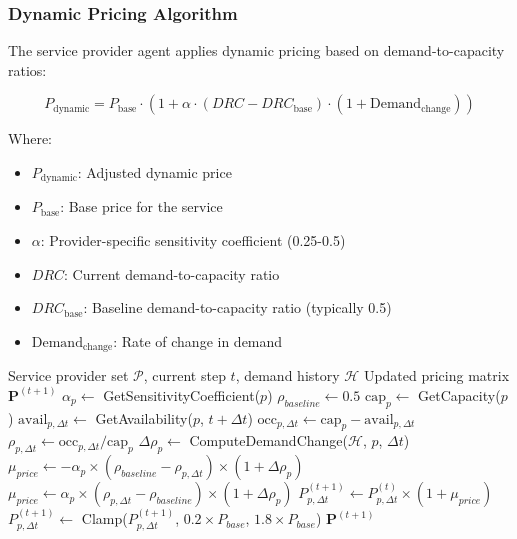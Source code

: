 \subsubsection{Dynamic Pricing Algorithm}
The service provider agent applies dynamic pricing based on demand-to-capacity ratios:

\begin{equation}
P_{\text{dynamic}} = P_{\text{base}} \cdot \left(1 + \alpha \cdot (DRC - DRC_{\text{base}}) \cdot (1 + \text{Demand}_{\text{change}})\right)
\end{equation}

Where:
\begin{itemize}
    \item $P_{\text{dynamic}}$: Adjusted dynamic price
    \item $P_{\text{base}}$: Base price for the service
    \item $\alpha$: Provider-specific sensitivity coefficient (0.25-0.5)
    \item $DRC$: Current demand-to-capacity ratio
    \item $DRC_{\text{base}}$: Baseline demand-to-capacity ratio (typically 0.5)
    \item $\text{Demand}_{\text{change}}$: Rate of change in demand
\end{itemize}

\begin{algorithm}
\caption{Demand-Responsive Dynamic Pricing}
\label{alg:dynamic-pricing}
\begin{algorithmic}[1]
\Require Service provider set $\mathcal{P}$, current step $t$, demand history $\mathcal{H}$
\Ensure Updated pricing matrix $\mathbf{P}^{(t+1)}$
    \State $\alpha_p \gets$ GetSensitivityCoefficient($p$)
    \State $\rho_{baseline} \gets 0.5$ 
     
        \State $\text{cap}_p \gets$ GetCapacity($p$)
        \State $\text{avail}_{p,\Delta t} \gets$ GetAvailability($p$, $t + \Delta t$)
        \State $\text{occ}_{p,\Delta t} \gets \text{cap}_p - \text{avail}_{p,\Delta t}$
        \State $\rho_{p,\Delta t} \gets \text{occ}_{p,\Delta t} / \text{cap}_p$
        \State $\Delta\rho_p \gets$ ComputeDemandChange($\mathcal{H}$, $p$, $\Delta t$)
            \State $\mu_{price} \gets -\alpha_p \times (\rho_{baseline} - \rho_{p,\Delta t}) \times (1 + \Delta\rho_p)$
        \Else
            \State $\mu_{price} \gets \alpha_p \times (\rho_{p,\Delta t} - \rho_{baseline}) \times (1 + \Delta\rho_p)$
        \EndIf
        \State $P_{p,\Delta t}^{(t+1)} \gets P_{p,\Delta t}^{(t)} \times (1 + \mu_{price})$
        \State $P_{p,\Delta t}^{(t+1)} \gets$ Clamp($P_{p,\Delta t}^{(t+1)}$, $0.2 \times P_{base}$, $1.8 \times P_{base}$)
    \EndFor
\EndFor
\State \Return $\mathbf{P}^{(t+1)}$
\end{algorithmic}
\end{algorithm}

